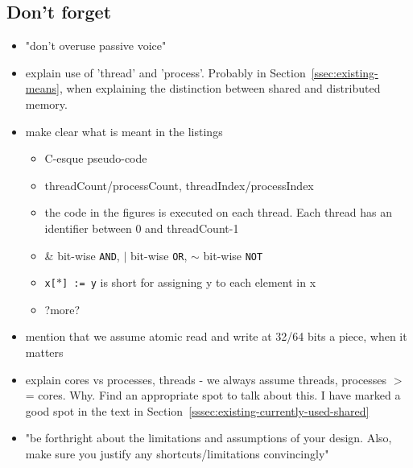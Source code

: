 \documentclass[a4paper, 10pt]{article}
\begin{document}
\begin{enumerate}
\section{Don't forget}
\begin{itemize}
	\item "don't overuse passive voice"
	\item explain use of 'thread' and 'process'. Probably in Section~\ref{ssec:existing-means}, when explaining the distinction between shared and distributed memory.
	\item make clear what is meant in the listings
		\begin{itemize}
			\item C-esque pseudo-code
			\item threadCount/processCount,  threadIndex/processIndex
			\item the code in the figures is executed on each thread. Each thread has an identifier between 0 and threadCount-1
			\item \& bit-wise \texttt{AND}, $|$ bit-wise \texttt{OR}, $\sim$ bit-wise \texttt{NOT}
			\item \texttt{x[$*$] := y} is short for assigning y to each element in x
			\item ?more?
		\end{itemize}
	\item mention that we assume atomic read and write at 32/64 bits a piece, when it matters
	\item explain cores vs processes, threads - we always assume threads, processes $>$= cores. Why. Find an appropriate spot to talk about this. I have marked a good spot in the text in Section~\ref{sssec:existing-currently-used-shared}
	\item "be forthright about the limitations and assumptions of your design. Also, make sure you justify any shortcuts/limitations convincingly"
\end{itemize}


\end{enumerate}
\end{document}
